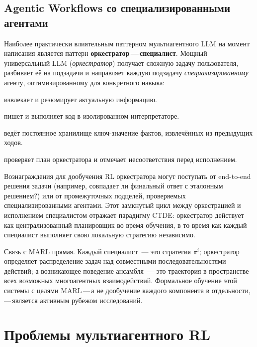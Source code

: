 \subsection{Agentic Workflows со специализированными агентами}

Наиболее практически влиятельным паттерном мультиагентного LLM на момент
написания является паттерн \textbf{оркестратор\,---\,специалист}.
Мощный универсальный LLM (\emph{оркестратор}) получает сложную
задачу пользователя, разбивает её на подзадачи и направляет каждую подзадачу
\emph{специализированному} агенту, оптимизированному для конкретного навыка:
\begin{description}[leftmargin=!, labelwidth=3.5cm]
  \item[Агент веб-поиска] извлекает и резюмирует актуальную информацию.
  \item[Агент кода] пишет и выполняет код в изолированном
    интерпретаторе.
  \item[Агент памяти] ведёт постоянное хранилище ключ-значение фактов,
    извлечённых из предыдущих ходов.
  \item[Агент-критик] проверяет план оркестратора и отмечает
    несоответствия перед исполнением.
\end{description}
Вознаграждения для дообучения RL оркестратора могут поступать от
end-to-end решения задачи (например, совпадает ли финальный ответ с
эталонным решением?) или от промежуточных подцелей, проверяемых
специализированными агентами. Этот замкнутый цикл между оркестрацией и
исполнением специалистом отражает парадигму CTDE: оркестратор
действует как централизованный планировщик во время обучения, в то время как каждый специалист
выполняет свою локальную стратегию независимо.

Связь с MARL прямая. Каждый специалист~--- это стратегия
$\pi^i$; оркестратор определяет распределение задач над совместными
последовательностями действий; а возникающее поведение ансамбля~--- это
траектория в пространстве всех возможных многоагентных взаимодействий.
Формальное обучение этой системы с целями MARL\,---\,а не
дообучение каждого компонента в отдельности,\,---\,является активным рубежом исследований.

\section{Проблемы мультиагентного RL}
\label{sec:marl-challenges}

